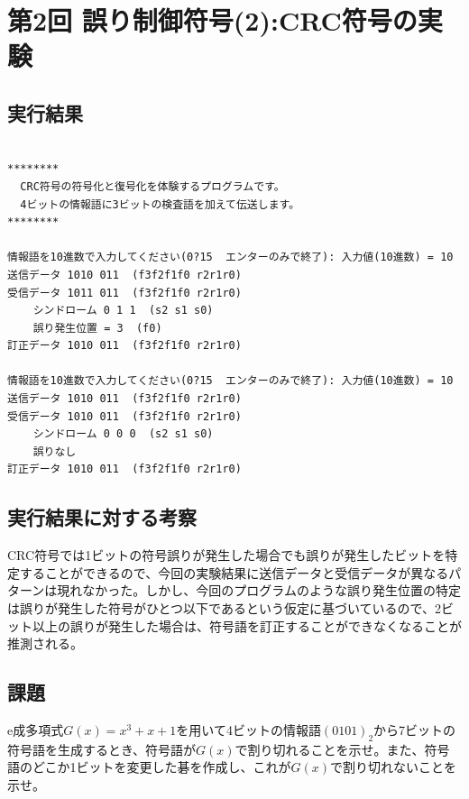 \documentclass[a4j]{celb-report}
\begin{document}
\newpage
\section{第2回 誤り制御符号(2):CRC符号の実験}
\subsection{実行結果}
\begin{lstlisting}[basicstyle=\ttfamily\footnotesize, frame=single]

********
  CRC符号の符号化と復号化を体験するプログラムです。
  4ビットの情報語に3ビットの検査語を加えて伝送します。
********

情報語を10進数で入力してください(0?15  エンターのみで終了): 入力値(10進数) = 10
送信データ 1010 011  (f3f2f1f0 r2r1r0)
受信データ 1011 011  (f3f2f1f0 r2r1r0)
    シンドローム 0 1 1  (s2 s1 s0) 
    誤り発生位置 = 3  (f0)
訂正データ 1010 011  (f3f2f1f0 r2r1r0)

情報語を10進数で入力してください(0?15  エンターのみで終了): 入力値(10進数) = 10
送信データ 1010 011  (f3f2f1f0 r2r1r0)
受信データ 1010 011  (f3f2f1f0 r2r1r0)
    シンドローム 0 0 0  (s2 s1 s0) 
    誤りなし
訂正データ 1010 011  (f3f2f1f0 r2r1r0)

\end{lstlisting}
\subsection{実行結果に対する考察}
CRC符号では1ビットの符号誤りが発生した場合でも誤りが発生したビットを特定することができるので、今回の実験結果に送信データと受信データが異なるパターンは現れなかった。しかし、今回のプログラムのような誤り発生位置の特定は誤りが発生した符号がひとつ以下であるという仮定に基づいているので、2ビット以上の誤りが発生した場合は、符号語を訂正することができなくなることが推測される。
\subsection{課題}
e成多項式$ G \left( x \right) = x ^3 + x + 1 $を用いて4ビットの情報語$ \left( 0101 \right) _2 $から7ビットの符号語を生成するとき、符号語が$ G \left( x \right) $で割り切れることを示せ。また、符号語のどこか1ビットを変更した碁を作成し、これが$ G \left( x \right) $で割り切れないことを示せ。


\end{document}
